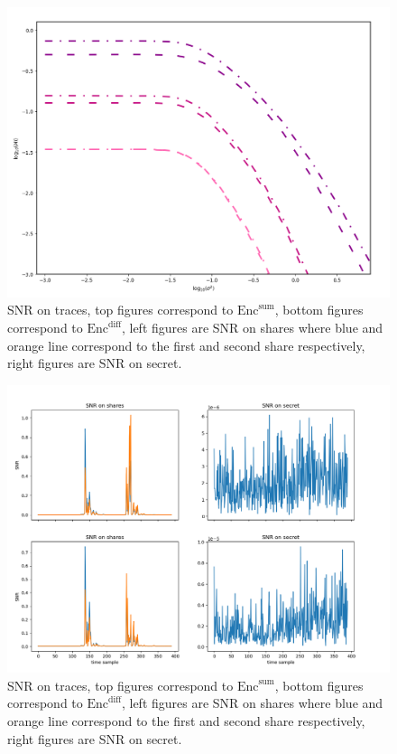 \documentclass{llncs}
\begin{document}
	
	\begin{figure}
		\vspace*{-0.0cm}
		\hspace*{0.0cm}\centering \includegraphics[width=12.0cm]{figures/MI_23_234.png}
		\vspace*{0.3cm}
		\caption{SNR on traces, top figures correspond to $\text{Enc}^{\text{sum}}$, bottom figures correspond to $\text{Enc}^{\text{diff}}$, left figures are SNR on shares where blue and orange line correspond to the first and second share respectively, right figures are SNR on secret.}\label{fig:miq23}\vspace*{-0.0cm}
	\end{figure}
	\begin{figure}
		\vspace*{-0.0cm}
		\hspace*{0.0cm}\centering \includegraphics[width=12.0cm]{figures/snr_2shares.png}
		\vspace*{0.3cm}
		\caption{SNR on traces, top figures correspond to $\text{Enc}^{\text{sum}}$, bottom figures correspond to $\text{Enc}^{\text{diff}}$, left figures are SNR on shares where blue and orange line correspond to the first and second share respectively, right figures are SNR on secret.}\label{fig:snr2}\vspace*{-0.0cm}
	\end{figure}
	
	
	
\end{document}
